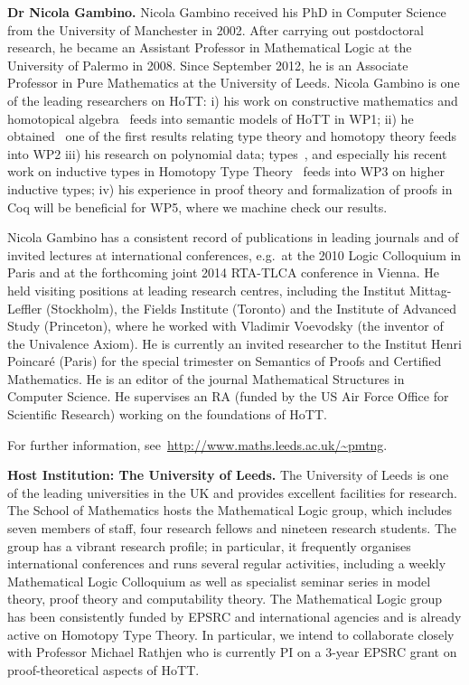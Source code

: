 \documentclass[a4paper,11pt]{article}
\begin{document}
\textbf{Dr Nicola Gambino.} Nicola Gambino received his PhD in
Computer Science from the University of Manchester in 2002. After
carrying out postdoctoral research, he became an Assistant Professor
in Mathematical Logic at the University of Palermo in 2008. Since
September 2012, he is an Associate Professor in Pure Mathematics at
the University of Leeds. Nicola Gambino is one of the leading
researchers on HoTT: 
i) his work on constructive mathematics and
homotopical algebra~\cite{GambinoN:homl2c,GambinoN:weilsh} feeds into
semantic models of HoTT in WP1; ii) he obtained~\cite{gambinoGarner:ITwfs} one of the first results
relating type theory and homotopy theory feeds into WP2 
iii) his research on polynomial data;
types~\cite{gambinoHyland:welfoundedTrees,GambinoN:polfpm}, and
especially his recent work on inductive types in Homotopy Type
Theory~\cite{awodeyGamSoja:indTypesInHTT} feeds into WP3 on higher
inductive types; iv) his experience in proof theory and formalization
of proofs in Coq will be beneficial for WP5, where we machine check
our results.

Nicola Gambino has a consistent record of
publications in leading journals and of invited lectures at
international conferences, {e.g.}~at the 2010 Logic Colloquium in Paris
and at the forthcoming joint 2014 RTA-TLCA conference in Vienna. He
held visiting positions at leading research centres, including the Institut Mittag-Leffler (Stockholm), the
Fields Institute (Toronto) and the Institute of Advanced Study
(Princeton), where he worked with Vladimir Voevodsky (the inventor of
the Univalence Axiom).  He is currently an invited researcher to the
Institut Henri Poincar\'e (Paris) for the special trimester on
Semantics of Proofs and Certified Mathematics.  He is an editor of the
journal Mathematical Structures in Computer Science.
He supervises
an RA (funded by the US Air Force Office for Scientific
Research) working on the foundations of HoTT. 

For further information,  see~\url{http://www.maths.leeds.ac.uk/~pmtng}.

\textbf{Host Institution: The University of Leeds.} The University of
Leeds is one of the leading universities in the UK and provides
excellent facilities for research. The School of Mathematics hosts the
Mathematical Logic group, which includes seven members of staff, four
research fellows and nineteen research students. The group has a
vibrant research profile; in particular, it frequently organises
international conferences and runs several regular activities,
including a weekly Mathematical Logic Colloquium as well as specialist
seminar series in model theory, proof theory and computability
theory. The Mathematical Logic group has been consistently funded by
EPSRC and international agencies and is already active on Homotopy
Type Theory. In particular, we intend to collaborate closely with
Professor Michael Rathjen who is currently PI
on a 3-year EPSRC grant on proof-theoretical aspects of HoTT. 
\end{document}
